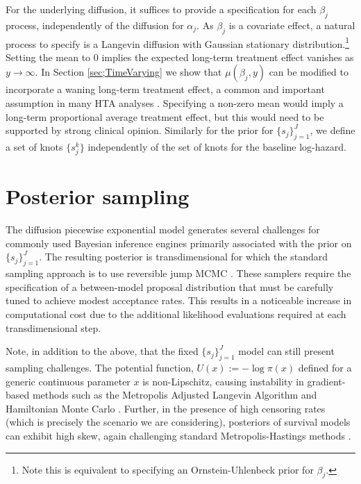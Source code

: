 \documentclass[ba,preprint]{imsart}
\theoremstyle{plain}
\theoremstyle{definition}
\theoremstyle{remark}
\begin{document}
For the underlying diffusion, it suffices to provide a specification for each $\beta_j$ process, independently of the diffusion for $\alpha_j$. As $\beta_j$ is a covariate effect, a natural process to specify is a Langevin diffusion with Gaussian stationary distribution.\footnote{Note this is equivalent to specifying an Ornstein-Uhlenbeck prior for $\beta_j$.} Setting the mean to 0 implies the expected long-term treatment effect vanishes as $y\to\infty$. In Section \ref{sec;TimeVarying} we show that $\mu(\beta_j,y)$ can be modified to incorporate a waning long-term treatment effect, a common and important assumption in many HTA analyses \citep{Jackson2017}. Specifying a non-zero mean would imply a long-term proportional average treatment effect, but this would need to be supported by strong clinical opinion. Similarly for the prior for $\{s_j\}_{j=1}^J$, we define a set of knots $\{s_j^k\}$ independently of the set of knots for the baseline log-hazard. 

\section{Posterior sampling}
\label{sec;Sampling}
The diffusion piecewise exponential model generates several challenges for commonly used Bayesian inference engines primarily associated with the prior on $\{s_j\}_{j=1}^J$. The resulting posterior is transdimensional for which the standard sampling approach is to use reversible jump MCMC \citep{Green1995}. These samplers require the specification of a between-model proposal distribution that must be carefully tuned to achieve modest acceptance rates. This results in a noticeable increase in computational cost due to the additional likelihood evaluations required at each transdimensional step. 

Note, in addition to the above, that the fixed $\{s_j\}_{j=1}^J$ model can still present sampling challenges. The potential function, $U(x) :=-\log\pi(x)$ {\color{red} defined for a generic continuous parameter $x$} is non-Lipschitz, causing instability in gradient-based methods such as the Metropolis Adjusted Langevin Algorithm \citep[MALA;][]{Roberts1996} and Hamiltonian Monte Carlo \citep[HMC;][]{Livingstone2019}. Further, in the presence of high censoring rates (which is precisely the scenario we are considering), posteriors of survival models can exhibit high skew, again challenging standard Metropolis-Hastings methods \citep{Hird2020}.
\end{document}
